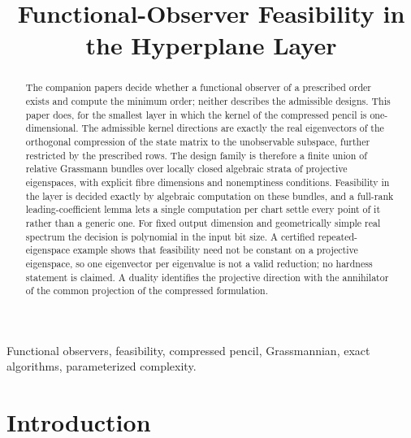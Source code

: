 \documentclass[journal]{IEEEtran}
\theoremstyle{plainn}
\theoremstyle{remark}
\begin{document}
\title{Functional-Observer Feasibility in the Hyperplane Layer}
\author{}
\maketitle

\begin{abstract}
The companion papers decide whether a functional observer of a prescribed order exists and compute the
minimum order; neither describes the admissible designs. This paper does, for the smallest layer in
which the kernel of the compressed pencil is one-dimensional. The admissible kernel directions are
exactly the real eigenvectors of the orthogonal compression of the state matrix to the unobservable
subspace, further restricted by the prescribed rows. The design family is therefore a finite union of
relative Grassmann bundles over locally closed algebraic strata of projective eigenspaces, with
explicit fibre dimensions and nonemptiness conditions. Feasibility in the layer is decided exactly by
algebraic computation on these bundles, and a full-rank leading-coefficient lemma lets a single
computation per chart settle every point of it rather than a generic one. For fixed output dimension
and geometrically simple real spectrum the decision is polynomial in the input bit size. A certified
repeated-eigenspace example shows that feasibility need not be constant on a projective eigenspace, so
one eigenvector per eigenvalue is not a valid reduction; no hardness statement is claimed. A duality
identifies the projective direction with the annihilator of the common projection of the compressed
formulation.
\end{abstract}

\begin{IEEEkeywords}
Functional observers, feasibility, compressed pencil, Grassmannian, exact algorithms,
parameterized complexity.
\end{IEEEkeywords}

\section{Introduction}\label{sec:intro}
\end{document}
